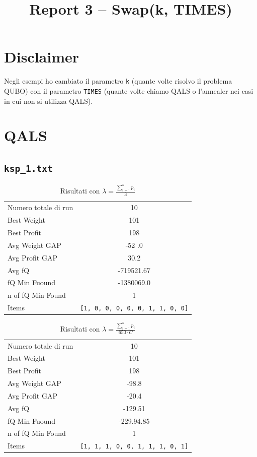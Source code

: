 \documentclass[a4paper,12pt]{article}
\title{Report 3 -- Swap(k, TIMES)}
\begin{document}
\maketitle

\newpage

\section{Disclaimer}
Negli esempi ho cambiato il parametro \texttt{k} (quante volte
risolvo il problema QUBO) con il parametro \texttt{TIMES} (quante volte chiamo QALS o l'annealer 
nei casi in cui non si utilizza QALS).

\section{QALS}

\subsection{\texttt{ksp\_1.txt}}

\begin{table}[H]
\centering
\begin{tabular}{lc}
\toprule
Numero totale di run & 10 \\
Best Weight & 101 \\
Best Profit & 198 \\
Avg Weight GAP & -52 .0\\
Avg Profit GAP & 30.2 \\
Avg fQ & -719521.67 \\
fQ Min Fuound & -1380069.0 \\
n of fQ Min Found & 1 \\
Items & \texttt{[1, 0, 0, 0, 0, 0, 1, 1, 0, 0]} \\
\bottomrule
\end{tabular}
\caption{Risultati con $\lambda = \displaystyle \frac{\sum_{i=1}^{n} p_i}{3}$}
\end{table}

\begin{table}[H]
\centering
\begin{tabular}{lc}
\toprule
Numero totale di run & 10 \\
Best Weight & 101 \\
Best Profit & 198 \\
Avg Weight GAP & -98.8 \\
Avg Profit GAP & -20.4 \\
Avg fQ & -129.51 \\
fQ Min Fuound & -229.94.85 \\
n of fQ Min Found & 1 \\
Items & \texttt{[1, 1, 1, 0, 0, 1, 1, 1, 0, 1]} \\
\bottomrule
\end{tabular}
\caption{Risultati con $\lambda = \displaystyle \frac{\sum_{i=1}^{n} p_i}{650 \cdot C}$}
\end{table}
\end{document}
